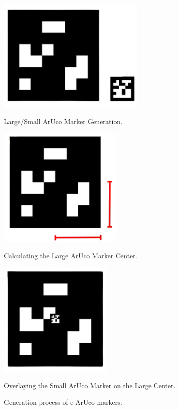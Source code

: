     \begin{figure}[h!]
        \centering
        \begin{minipage}{0.3\textwidth}
            \centering
            \includegraphics[width=0.65\textwidth]{pictures/pose_1.png}
            \caption{Large/Small ArUco Marker Generation.}
            \label{fig:imagen1}
        \end{minipage}
        \hfill
        \begin{minipage}{0.3\textwidth}
            \centering
            \includegraphics[width=0.55\textwidth]{pictures/pose_2.png}
            \caption{Calculating the Large ArUco Marker Center.}
            \label{fig:imagen2}
        \end{minipage}
        \hfill
        \begin{minipage}{0.3\textwidth}
            \centering
            \includegraphics[width=0.5\textwidth]{pictures/pose_3.png}
            \caption{Overlaying the Small ArUco Marker on the Large Center.}
            \label{fig:imagen2}
        \end{minipage}
        \caption{Generation process of e-ArUco markers.}
    \end{figure}


